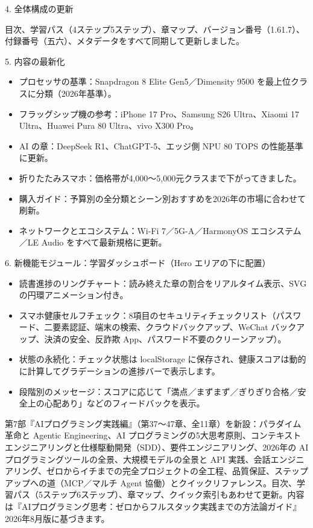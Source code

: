 4. 全体構成の更新

目次、学習パス（4ステップ5ステップ）、章マップ、バージョン番号（1.61.7）、付録番号（五六）、メタデータをすべて同期して更新しました。

5. 内容の最新化

\begin{itemize}
  \item プロセッサの基準：Snapdragon 8 Elite Gen5／Dimensity 9500 を最上位クラスに分類（2026年基準）。
  \item フラッグシップ機の参考：iPhone 17 Pro、Samsung S26 Ultra、Xiaomi 17 Ultra、Huawei Pura 80 Ultra、vivo X300 Pro。
  \item AI の章：DeepSeek R1、ChatGPT-5、エッジ側 NPU 80 TOPS の性能基準に更新。
  \item 折りたたみスマホ：価格帯が4,000〜5,000元クラスまで下がってきました。
  \item 購入ガイド：予算別の全分類とシーン別おすすめを2026年の市場に合わせて刷新。
  \item ネットワークとエコシステム：Wi-Fi 7／5G-A／HarmonyOS エコシステム／LE Audio をすべて最新規格に更新。
\end{itemize}

6. 新機能モジュール：学習ダッシュボード（Hero エリアの下に配置）

\begin{itemize}
  \item 読書進捗のリングチャート：読み終えた章の割合をリアルタイム表示、SVG の円環アニメーション付き。
  \item スマホ健康セルフチェック：8項目のセキュリティチェックリスト（パスワード、二要素認証、端末の検索、クラウドバックアップ、WeChat バックアップ、決済の安全、反詐欺 App、パスワード不要のクリーンアップ）。
  \item 状態の永続化：チェック状態は localStorage に保存され、健康スコアは動的に計算してグラデーションの進捗バーで表示します。
  \item 段階別のメッセージ：スコアに応じて「満点／まずまず／ぎりぎり合格／安全上の心配あり」などのフィードバックを表示。
\end{itemize}


第7部『AIプログラミング実践編』（第37〜47章、全11章）を新設：パラダイム革命と Agentic Engineering、AI プログラミングの5大思考原則、コンテキストエンジニアリングと仕様駆動開発（SDD）、要件エンジニアリング、2026年の AI プログラミングツールの全景、大規模モデルの全景と API 実践、会話エンジニアリング、ゼロからイチまでの完全プロジェクトの全工程、品質保証、ステップアップへの道（MCP／マルチ Agent 協働）とクイックリファレンス。目次、学習パス（5ステップ6ステップ）、章マップ、クイック索引もあわせて更新。内容は『AIプログラミング思考：ゼロからフルスタック実践までの方法論ガイド』2026年8月版に基づきます。

